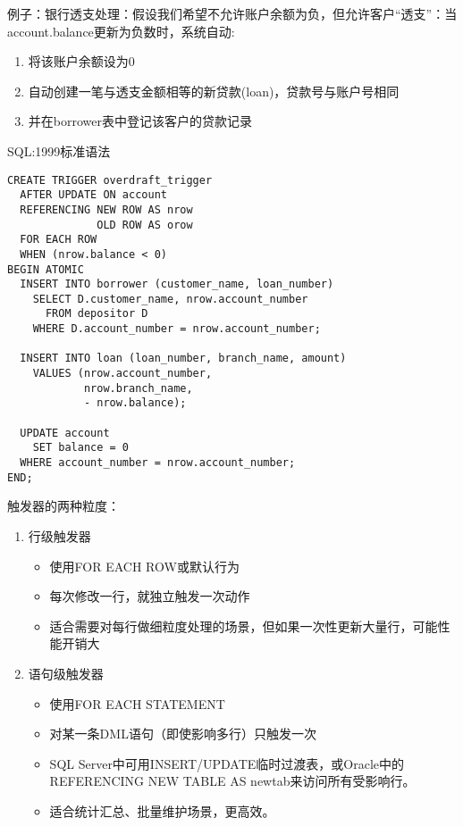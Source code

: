 例子：银行透支处理：假设我们希望不允许账户余额为负，但允许客户“透支”：当account.balance更新为负数时，系统自动:
\begin{enumerate}
    \item 将该账户余额设为0
    \item 自动创建一笔与透支金额相等的新贷款(loan)，贷款号与账户号相同
    \item 并在borrower表中登记该客户的贷款记录
\end{enumerate}

SQL:1999标准语法
\begin{lstlisting}[style=sqlstyle]
CREATE TRIGGER overdraft_trigger
  AFTER UPDATE ON account
  REFERENCING NEW ROW AS nrow
              OLD ROW AS orow
  FOR EACH ROW
  WHEN (nrow.balance < 0)
BEGIN ATOMIC
  INSERT INTO borrower (customer_name, loan_number)
    SELECT D.customer_name, nrow.account_number
      FROM depositor D
    WHERE D.account_number = nrow.account_number;
    
  INSERT INTO loan (loan_number, branch_name, amount)
    VALUES (nrow.account_number,
            nrow.branch_name,
            - nrow.balance);

  UPDATE account
    SET balance = 0
  WHERE account_number = nrow.account_number;
END;
\end{lstlisting}

触发器的两种粒度：
\begin{enumerate}
    \item 行级触发器
       \begin{itemize}
          \item 使用FOR EACH ROW或默认行为
          \item 每次修改一行，就独立触发一次动作
          \item 适合需要对每行做细粒度处理的场景，但如果一次性更新大量行，可能性能开销大
       \end{itemize}
    \item 语句级触发器
       \begin{itemize}
          \item 使用FOR EACH STATEMENT
          \item 对某一条DML语句（即使影响多行）只触发一次
          \item SQL Server中可用INSERT/UPDATE临时过渡表，或Oracle中的REFERENCING NEW TABLE AS newtab来访问所有受影响行。
          \item 适合统计汇总、批量维护场景，更高效。
       \end{itemize}
\end{enumerate}


